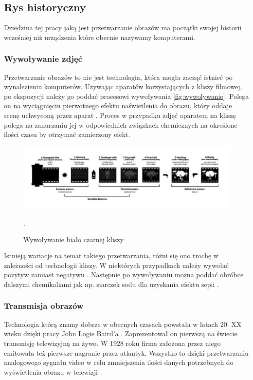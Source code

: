 \subsection{Rys historyczny}

Dziedzina tej pracy jaką jest przetwarzanie obrazów ma początki swojej historii wcześniej niż urządzenia które obecnie nazywamy komputerami.

\subsubsection{Wywoływanie zdjęć}
Przetwarzanie obrazów to nie jest technologia, która mogła zacząć istnieć po wynalezieniu komputerów. Używając aparatów korzystających z kliszy filmowej, po ekspozycji należy go poddać procesowi wywoływania \autoref{fig:wywolywanie}. 
Polega on na wyciągnięciu pierwotnego efektu naświetlenia do obrazu, który oddaje scenę uchwyconą przez aparat \cite{doi:https://doi.org/10.1002/14356007.a20_001}. Proces w przypadku zdjęć aparatem na kliszę polega na zanurzaniu jej w odpowiednich związkach chemicznych na określone ilości czasu by otrzymać zamierzony efekt. 

\begin{figure}[H]
    \centering
    \includegraphics{./images/Picture1.jpg}
    \caption{Wywoływanie biało czarnej kliszy \cite{film}}.
    \label{fig:wywolywanie}
\end{figure}


Istnieją wariacje na temat takiego przetwarzania, różni się ono trochę w zależności od technologii kliszy. W niektórych przypadkach należy wywołać pozytyw zamiast negatywu \cite{almanac}. 
Następnie po wywoływaniu można poddać obróbce dalszymi chemikaliami jak np. siarczek sodu dla uzyskania efektu sepii \cite{sepia}. 

\subsubsection{Transmisja obrazów}
Technologia którą znamy dobrze w obecnych czasach powstała w latach 20. XX wieku dzięki pracy John Logie Baird'a \cite{times1926}. 
Zaprezentował on pierwszą na świecie transmisję telewizyjną na żywo.
W 1928 roku \cite{bairdCompany} firma założona przez niego emitowała też pierwsze nagranie przez atlantyk. 
Wszystko to dzięki przetwarzaniu analogowego sygnału video w celu zmniejszenia ilości danych potrzebnych do wyświetlenia obrazu w telewizji \cite{analogVideo}.

